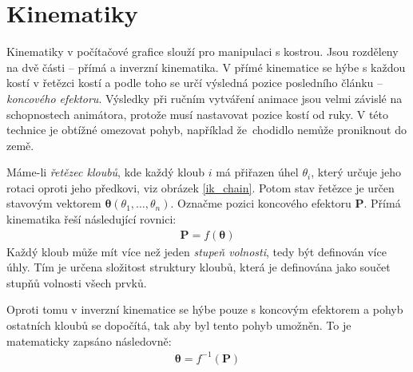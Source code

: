 \chapter{Kinematiky} 
\label{kinematics}
Kinematiky v počítačové grafice slouží pro manipulaci s kostrou. Jsou  rozděleny na dvě části -- přímá a inverzní kinematika. V přímé kinematice se hýbe s každou kostí v řetězci kostí a podle toho se určí výsledná pozice posledního článku -- \textit{koncového efektoru}. Výsledky při ručním vytváření animace jsou velmi závislé na schopnostech animátora, protože musí nastavovat pozice kostí od ruky. V této technice je obtížné omezovat pohyb, například že~chodidlo nemůže proniknout do země. 

Máme-li \textit{řetězec kloubů}, kde každý kloub $i$ má přiřazen úhel $\theta_i$, který určuje jeho rotaci oproti jeho předkovi, viz obrázek \ref{ik_chain}. Potom stav řetězce je určen stavovým vektorem $\boldsymbol{\theta}(\theta_1,\dots,\theta_n)$. Označme pozici koncového efektoru $\mathbf{P}$. Přímá kinematika řeší následující rovnici:
\begin{eqnarray}
\mathbf{P} = f(\boldsymbol{\theta})\label{r.forward_kinematics}
\end{eqnarray}
Každý kloub může mít více než jeden \textit{stupeň volnosti}, tedy být definován více úhly. Tím je určena složitost struktury kloubů, která je definována jako součet stupňů volnosti všech prvků.

Oproti tomu v inverzní kinematice \cite{Buss09introductionto,welman} se hýbe pouze s koncovým efektorem a pohyb ostatních kloubů se dopočítá, tak aby byl tento pohyb umožněn. To je matematicky zapsáno následovně:
\begin{eqnarray}
\boldsymbol{\theta} = f^{-1}(\mathbf{P})\label{r.inverse_kinematics}
\end{eqnarray}

